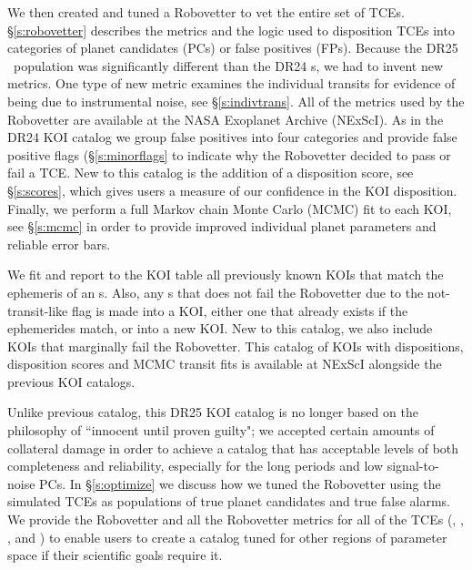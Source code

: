 We then created and tuned a Robovetter to vet the entire set of TCEs. \S\ref{s:robovetter} describes the metrics and the logic used to disposition TCEs into categories of planet candidates (PCs) or false positives (FPs). Because the DR25 \opstce\ population was significantly different than the DR24 \opstce s, we had to invent new metrics. One type of new metric examines the individual transits for evidence of being due to instrumental noise, see \S\ref{s:indivtrans}.  All of the metrics used by the Robovetter are available at the NASA Exoplanet Archive (NExScI). As in the DR24 KOI catalog we group false positives into four categories and provide false positive flags (\S\ref{s:minorflags} to indicate why the Robovetter decided to pass or fail a TCE.  New to this catalog is the addition of a disposition score, see \S\ref{s:scores}, which gives users a measure of our confidence in the KOI disposition. Finally, we perform a full Markov chain Monte Carlo (MCMC) fit to each KOI, see \S\ref{s:mcmc} in order to provide improved individual planet parameters and reliable error bars.

We fit and report to the KOI table all previously known KOIs that match the ephemeris of an \opstce s. Also, any \opstce s that does not fail the Robovetter due to the not-transit-like flag is made into a KOI, either one that already exists if the ephemerides match, or into a new KOI. New to this catalog, we also include KOIs that marginally fail the Robovetter.   This catalog of KOIs with dispositions, disposition scores and MCMC transit fits is available at NExScI alongside the previous KOI catalogs.

Unlike previous catalog, this DR25 KOI catalog is no longer based on the philosophy of ``innocent until proven guilty"; we accepted certain amounts of collateral damage in order to achieve a catalog that has acceptable levels of both completeness and reliability, especially for the long periods and low signal-to-noise PCs. In \S\ref{s:optimize} we discuss how we tuned the Robovetter using the simulated TCEs as populations of true planet candidates and true false alarms. We provide the Robovetter and all the Robovetter metrics for all of the TCEs (\opstce, \injtce, \invtce, and \scrtce) to enable users to create a catalog tuned for other regions of parameter space if their scientific goals require it. 

